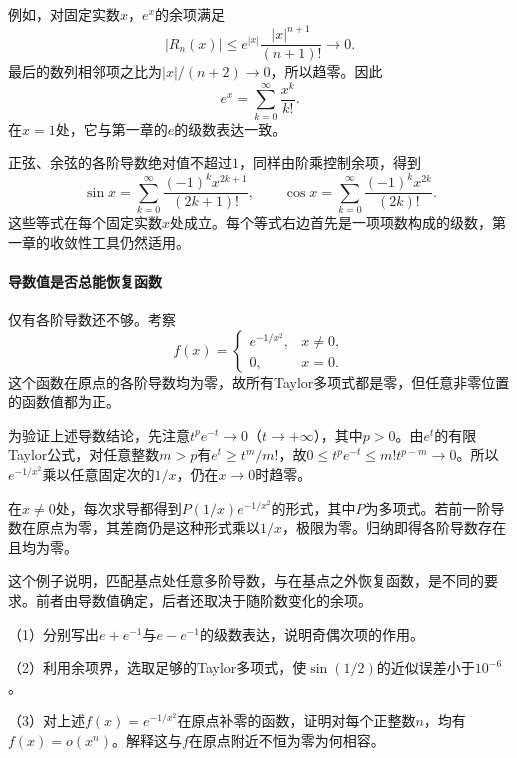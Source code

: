 例如，对固定实数\(x\)，\(e^x\)的余项满足
\begin{equation*}
 |R_n(x)|\le e^{|x|}\frac{|x|^{n+1}}{(n+1)!}\longrightarrow0.
\end{equation*}
最后的数列相邻项之比为\(|x|/(n+2)\to0\)，所以趋零。因此
\begin{equation}\label{eq:calculus-exponential-series}
 e^x=\sum_{k=0}^{\infty}\frac{x^k}{k!}.
\end{equation}
在\(x=1\)处，它与第一章的\(e\)的级数表达一致。

正弦、余弦的各阶导数绝对值不超过\(1\)，同样由阶乘控制余项，得到
\begin{equation*}
 \sin x=\sum_{k=0}^{\infty}\frac{(-1)^kx^{2k+1}}{(2k+1)!},\qquad
 \cos x=\sum_{k=0}^{\infty}\frac{(-1)^kx^{2k}}{(2k)!}.
\end{equation*}
这些等式在每个固定实数\(x\)处成立。每个等式右边首先是一项项数构成的级数，第一章的收敛性工具仍然适用。

\paragraph{导数值是否总能恢复函数} \mbox{}

仅有各阶导数还不够。考察
\begin{equation*}
 f(x)=\begin{cases}e^{-1/x^2},&x\ne0,\\0,&x=0.\end{cases}
\end{equation*}
这个函数在原点的各阶导数均为零，故所有Taylor多项式都是零，但任意非零位置的函数值都为正。

为验证上述导数结论，先注意\(t^p e^{-t}\to0\)（\(t\to+\infty\)），其中\(p>0\)。由\(e^t\)的有限Taylor公式，对任意整数\(m>p\)有\(e^t\ge t^m/m!\)，故\(0\le t^pe^{-t}\le m!t^{p-m}\to0\)。所以\(e^{-1/x^2}\)乘以任意固定次的\(1/x\)，仍在\(x\to0\)时趋零。

在\(x\ne0\)处，每次求导都得到\(P(1/x)e^{-1/x^2}\)的形式，其中\(P\)为多项式。若前一阶导数在原点为零，其差商仍是这种形式乘以\(1/x\)，极限为零。归纳即得各阶导数存在且均为零。

这个例子说明，匹配基点处任意多阶导数，与在基点之外恢复函数，是不同的要求。前者由导数值确定，后者还取决于随阶数变化的余项。

\begin{exercise}
\mbox{}\par\nobreak

（1）分别写出\(e+e^{-1}\)与\(e-e^{-1}\)的级数表达，说明奇偶次项的作用。

（2）利用余项界，选取足够的Taylor多项式，使\(\sin(1/2)\)的近似误差小于\(10^{-6}\)。

（3）对上述\(f(x)=e^{-1/x^2}\)在原点补零的函数，证明对每个正整数\(n\)，均有\(f(x)=o(x^n)\)。解释这与\(f\)在原点附近不恒为零为何相容。
\end{exercise}
\endgroup
